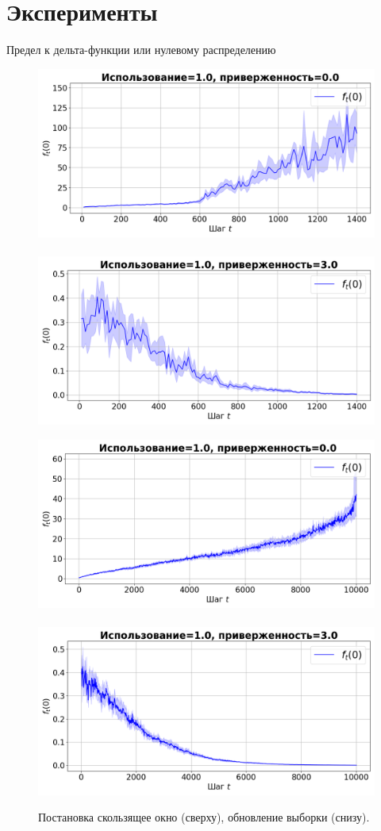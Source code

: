\documentclass[aspectratio=169]{beamer}
\begin{document}
\section{Эксперименты}
    \begin{frame}{Предел к дельта-функции или нулевому распределению}
    \footnotesize
    \vspace{-2mm}
        \begin{figure}
            \centering
            \includegraphics[width=0.45\linewidth]{pictures/ft0_sw_synthetic_sgd_model_50_1.0_0.0.png}~
            \includegraphics[width=0.45\linewidth]{pictures/ft0_sw_synthetic_sgd_model_50_1.0_3.0.png}

            \includegraphics[width=0.45\linewidth]{pictures/ft0_su_synthetic_sgd_model_50_1.0_0.0.png}~
            \includegraphics[width=0.45\linewidth]{pictures/ft0_su_synthetic_sgd_model_50_1.0_3.0.png}
            \vspace{-4mm}
            \caption{Постановка скользящее окно (сверху), обновление выборки (снизу).}
        \end{figure}
    \end{frame}
\end{document}
